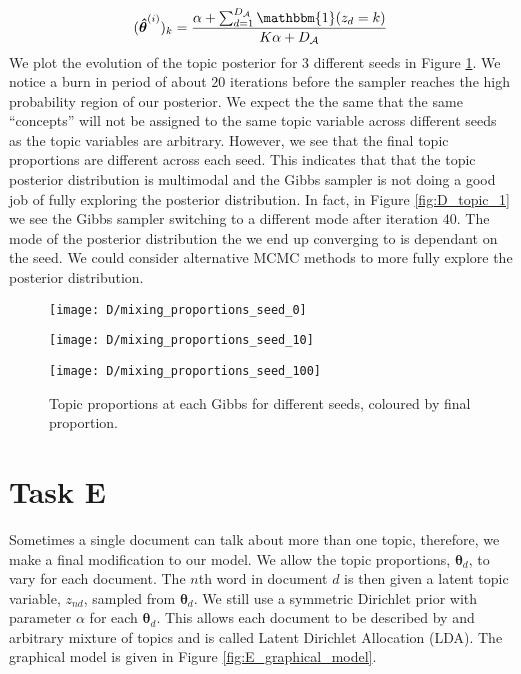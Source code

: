 \documentclass[11pt]{article}
\begin{document}
\begin{equation}
    \begin{aligned}
        (\boldsymbol{\hat \theta}^{(i)})_k = \frac{\alpha + \sum_{d=1}^{D_{\mathcal{A}}} \mathbbm{1}(z_{d} = k)}{K \alpha + D_{\mathcal{A}}}
    \end{aligned}
    \label{eq:D_topic_posterior}
\end{equation}
We plot the evolution of the topic posterior for 3 different seeds in Figure \ref{fig:D_topic_proportions}. We notice a burn in period of about $20$ iterations before the sampler reaches the high probability region of our posterior. We expect the the same that the same ``concepts'' will not be assigned to the same topic variable across different seeds as the topic variables are arbitrary. 
However, we see that the final topic proportions are different across each seed. This indicates that that the topic posterior distribution is multimodal and the Gibbs sampler is not doing a good job of fully exploring the posterior distribution. In fact, in Figure \ref{fig:D_topic_1} we see the Gibbs sampler switching to a different mode after iteration $40$. The mode of the posterior distribution the we end up converging to is dependant on the seed. We could consider alternative MCMC methods to more fully explore the posterior distribution.
\begin{figure}
    \centering
    \begin{minipage}{0.32\textwidth}
        \centering
        \texttt{[image: D/mixing\_proportions\_seed\_0]}
        \label{fig:D_topic_0}
    \end{minipage}
    \begin{minipage}{0.32\textwidth}
        \centering
        \texttt{[image: D/mixing\_proportions\_seed\_10]}
        \label{fig:D_topic_1}
    \end{minipage}
    \begin{minipage}{0.32\textwidth}
        \centering
        \texttt{[image: D/mixing\_proportions\_seed\_100]}
        \label{fig:D_topic_2}
    \end{minipage}
    \caption{Topic proportions at each Gibbs for different seeds, coloured by final proportion.}
    \label{fig:D_topic_proportions}
\end{figure}

\section{Task E}
Sometimes a single document can talk about more than one topic, therefore, we make a final modification to our model. We allow the topic proportions, $\boldsymbol{\theta}_d$, to vary for each document. The $n$th word in document $d$ is then given a latent topic variable, $z_{nd}$, sampled from $\boldsymbol{\theta}_d$. We still use a symmetric Dirichlet prior with parameter $\alpha$ for each $\boldsymbol{\theta}_d$. This allows each document to be described by and arbitrary mixture of topics and is called Latent Dirichlet Allocation (LDA). The graphical model is given in Figure \ref{fig:E_graphical_model}.
\end{document}
